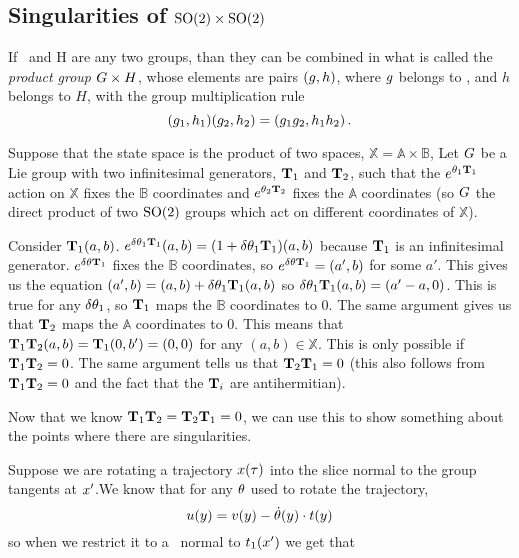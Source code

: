 {\subsection{Singularities of $\textrm{SO}(2) \times \textrm{SO}(2)$}

                                                    \toCB
If \Group\ and H are any two groups, than they can be combined in
what is called the {\em product group} $G \times H$, whose
elements are pairs $(g,h)$, where $g$ belongs to \Group, and
$h$ belongs to $H$, with the group multiplication rule
\[
(g_1,h_1)(g_2,h_2)=(g_1 g_2,h_1 h_2)
\,.
\]


Suppose that the state space is the product of two spaces, $\mathbb{X}=\mathbb{A} \times \mathbb{B}$,
Let $G$ be a Lie group with two infinitesimal generators, $\mathbf{T}_1$ and $\mathbf{T}_2$, such that the $e^{{\bf \theta}_1 \mathbf{T}_1}$ action on $\mathbb{X}$ fixes the $\mathbb{B}$ coordinates and $e^{{\bf \theta}_2 \mathbf{T}_2}$ fixes the $\mathbb{A}$ coordinates (so $G$ the direct product of two $\textrm{SO}(2)$ groups which act on different coordinates of $\mathbb{X}$).

Consider $\mathbf{T}_1 (a,b)$. $e^{\delta {\bf \theta}_1 \mathbf{T}_1}(a,b)=(1+\delta {\bf \theta}_1 \mathbf{T}_1) (a,b)$ because $\mathbf{T}_1$ is an infinitesimal generator. $e^{\delta {\bf \theta} \mathbf{T}_1}$ fixes the $\mathbb{B}$ coordinates, so $e^{\delta {\bf \theta} \mathbf{T}_1}=(a',b)$ for some $a'$. This gives us the equation $(a',b)=(a,b)+\delta {\bf \theta}_1 \mathbf{T}_1(a,b)$ so $\delta {\bf \theta}_1 \mathbf{T}_1(a,b)=(a'-a,0)$. This is true for any $\delta {\bf \theta}_1$, so $\mathbf{T}_1$ maps the $\mathbb{B}$ coordinates to 0. The same argument gives us that $\mathbf{T}_2$ maps the $\mathbb{A}$ coordinates to 0. This means that $\mathbf{T}_1 \mathbf{T}_2 (a,b)=\mathbf{T}_1 (0,b')=(0,0)$ for any $(a,b) \in \mathbb{X}$. This is only possible if $\mathbf{T}_1 \mathbf{T}_2=0$. The same argument tells us that $\mathbf{T}_2 \mathbf{T}_1=0$ (this also follows from $\mathbf{T}_1 \mathbf{T}_2=0$ and the fact that the $\mathbf{T}_i$ are antihermitian).

Now that we know $\mathbf{T}_1 \mathbf{T}_2=\mathbf{T}_2 \mathbf{T}_1=0$, we can use this to show something about the points where there are singularities.

Suppose we are rotating a trajectory $x(\tau)$ into the slice normal to the group tangents at $x'$.We know that for any ${\bf \theta}$ used to rotate the trajectory,
\begin{equation*}
u(y) = v(y)-\dot{{\bf \theta}}(y) \cdot t(y)
\end{equation*}
so when we restrict it to a \slice\ normal to $t_1(x')$ we get that

}
